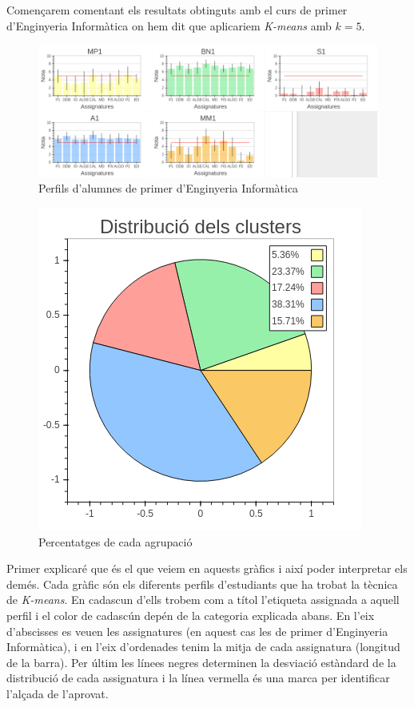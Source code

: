 \documentclass[12pt,a4paper,catalan]{article}
\begin{document}
\newpage

Començarem comentant els resultats obtinguts amb el curs de primer d'Enginyeria Informàtica on hem dit que aplicariem \textit{K-means} amb $k=5$.

\begin{figure}[h]
\centering
\includegraphics[width=\linewidth]{img/perfils_primer_info.png}
\caption{Perfils d'alumnes de primer d'Enginyeria Informàtica}
\end{figure}

\begin{figure}[h]
\centering
\includegraphics[width=.55\linewidth]{img/perfils_primer_info_pastilla.png}
\caption{Percentatges de cada agrupació}
\end{figure}

Primer explicaré que és el que veiem en aquests gràfics i així poder interpretar els demés. Cada gràfic són els diferents perfils d'estudiants que ha trobat la tècnica de \textit{K-means}. En cadascun d'ells trobem com a títol l'etiqueta assignada a aquell perfil i el color de cadascún depén de la categoria explicada abans. En l'eix d'abscisses es veuen les assignatures (en aquest cas les de primer d'Enginyeria Informàtica), i en l'eix d'ordenades tenim la mitja de cada assignatura (longitud de la barra). Per últim les línees negres determinen la desviació estàndard de la distribució de cada assignatura i la línea vermella és una marca per identificar l'alçada de l'aprovat.
\end{document}
